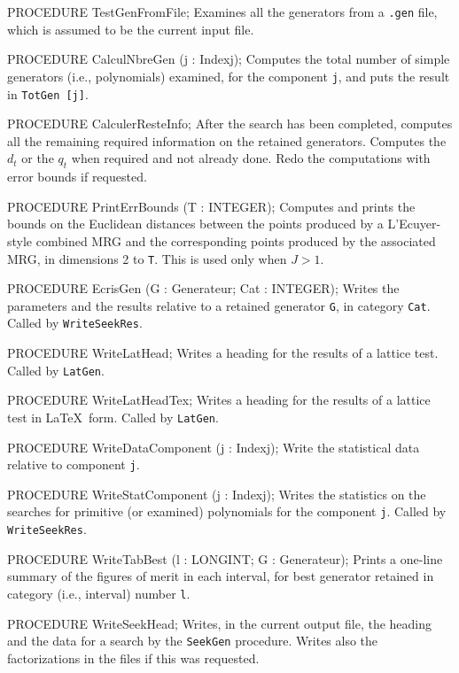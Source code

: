 PROCEDURE TestGenFromFile;
\endcode
 \tab
  Examines all the generators from a {\tt .gen} file,
  which is assumed to be the current input file.
 \endtab
\code

PROCEDURE CalculNbreGen (j : Indexj);
\endcode
 \tab
  Computes the total number of simple generators (i.e., polynomials)
  examined, for the component {\tt j}, and puts the result in
  {\tt TotGen [j]}.
 \endtab
\code

PROCEDURE CalculerResteInfo;
\endcode
 \tab 
  After the search has been completed, computes all the remaining required
  information on the retained generators.
  Computes the $d_t$ or the $q_t$ when required and not already done.
  Redo the computations with error bounds if requested.
 \endtab
\code

PROCEDURE PrintErrBounds (T : INTEGER);
\endcode
 \tab
  Computes and prints the bounds on the Euclidean distances between
  the points produced by a L'Ecuyer-style combined MRG and the 
  corresponding points produced by the associated MRG,
  in dimensions 2 to {\tt T}.  This is used only when $J > 1$.
 \endtab
\code

PROCEDURE EcrisGen (G : Generateur;    Cat : INTEGER);
\endcode
 \tab
  Writes the parameters and the results relative to a retained 
  generator {\tt G}, in category {\tt Cat}.
  Called by {\tt WriteSeekRes}.
 \endtab
\code

PROCEDURE WriteLatHead;
\endcode
 \tab
  Writes a heading for the results of a lattice test.
  Called by {\tt LatGen}.
 \endtab
\code

PROCEDURE WriteLatHeadTex;
\endcode
 \tab
  Writes a heading for the results of a lattice test in \LaTeX\ form.
  Called by {\tt LatGen}.
 \endtab
\code

PROCEDURE WriteDataComponent (j : Indexj);
\endcode
 \tab
  Write the statistical data relative to component {\tt j}.
 \endtab
\code

PROCEDURE WriteStatComponent (j : Indexj);
\endcode
 \tab
   Writes the statistics on the searches for primitive 
   (or examined) polynomials for the component {\tt j}.
   Called by {\tt WriteSeekRes}.
 \endtab
\code

PROCEDURE WriteTabBest (l : LONGINT;  G : Generateur);
\endcode
 \tab
  Prints a one-line summary of the figures of merit in each interval,
  for best generator retained in category (i.e., interval) number {\tt l}.
 \endtab
\code

PROCEDURE WriteSeekHead;
\endcode
 \tab
  Writes, in the current output file, the heading and the data 
  for a search by the {\tt SeekGen} procedure.
  Writes also the factorizations in the files if this was requested.
 \endtab
\code 

